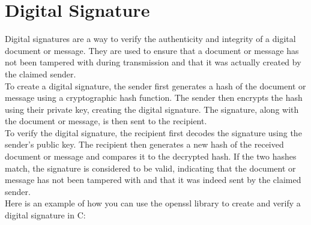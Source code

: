 \documentclass{article}
\begin{document}
\section{Digital Signature}
Digital signatures are a way to verify the authenticity and integrity of a digital document or message. They are used to ensure that a document or message has not been tampered with during transmission and that it was actually created by the claimed sender.\\
To create a digital signature, the sender first generates a hash of the document or message using a cryptographic hash function. The sender then encrypts the hash using their private key, creating the digital signature. The signature, along with the document or message, is then sent to the recipient.\\
To verify the digital signature, the recipient first decodes the signature using the sender's public key. The recipient then generates a new hash of the received document or message and compares it to the decrypted hash. If the two hashes match, the signature is considered to be valid, indicating that the document or message has not been tampered with and that it was indeed sent by the claimed sender.\\
Here is an example of how you can use the openssl library to create and verify a digital signature in C:
\end{document}

